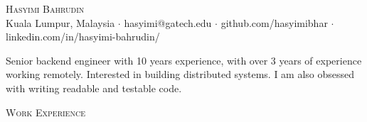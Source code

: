 \documentclass[a4paper]{article}
\newcommand{\lineunder} {
    \vspace*{-8pt} \\
    \hspace*{-18pt} \hrulefill \\
}
\newcommand{\header} [1] {
    {\hspace*{-18pt}\vspace*{6pt} \textsc{#1}}
    \vspace*{-6pt} \lineunder
}
\begin{document}
\vspace*{-40pt}

    

\vspace*{-10pt}
\begin{center}
	{\Huge \scshape {Hasyimi Bahrudin}}
	\\
	Kuala Lumpur, Malaysia $\cdot$
	hasyimi@gatech.edu $\cdot$
	github.com/hasyimibhar $\cdot$
	linkedin.com/in/hasyimi-bahrudin/
	\\
\end{center}


\begin{center}
	Senior backend engineer with 10 years experience, with over 3 years of experience working remotely. Interested in building distributed systems. I am also obsessed with writing readable and testable code.
\end{center}

\header{Work Experience}
\vspace{1mm}
\end{document}
